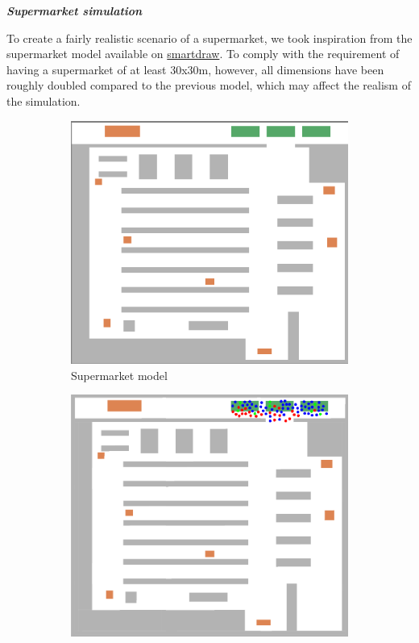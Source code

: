 \textit{\textbf{Supermarket simulation}}

To create a fairly realistic scenario of a supermarket, we took inspiration from the supermarket model available on \href{https://www.smartdraw.com/store-layout/examples/grocery-store-layout/}{smartdraw}. To comply with the requirement of having a supermarket of at least 30x30m, however, all dimensions have been roughly doubled compared to the previous model, which may affect the realism of the simulation.

\begin{figure}[H]
    \begin{subfigure}[b]{0.49\textwidth}
        \centering
        \includegraphics[width=\textwidth]{images/supermarket_design.png}
        \caption{Supermarket model}
        \label{fig:supermarket_a}
    \end{subfigure}
    \hfill
    \begin{subfigure}[b]{0.49\textwidth}
        \centering
        \includegraphics[width=\textwidth]{images/task5_shoppingbegin.png}

\end{subfigure}
\end{figure}
